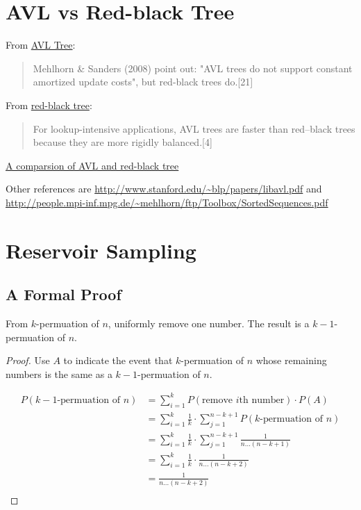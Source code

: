 \documentclass{book}
\begin{document}
\chapter{AVL vs Red-black Tree}

From \href{https://en.wikipedia.org/wiki/AVL_tree}{AVL Tree}:
\begin{quotation}
Mehlhorn \& Sanders (2008) point out: "AVL trees do not support constant amortized update costs", but red-black trees do.[21]
\end{quotation}


From \href{https://en.wikipedia.org/wiki/Red-black_tree}{red-black tree}:
\begin{quotation}
For lookup-intensive applications, AVL trees are faster than red–black trees because they are more rigidly balanced.[4]
\end{quotation}

\href{https://docs.google.com/presentation/d/1w_n0Ejpe7BGwJmASEXJIcOYWEc5O0Nycibc3IXQfH_c/edit#slide=id.g1221257ba_010}{A
comparsion of AVL and red-black tree}


Other references are \url{http://www.stanford.edu/~blp/papers/libavl.pdf} and
\url{http://people.mpi-inf.mpg.de/~mehlhorn/ftp/Toolbox/SortedSequences.pdf}

\chapter{Reservoir Sampling}
\section{A Formal Proof}
From $k$-permuation of $n$, uniformly remove one number. The result is a
$k-1$-permuation of $n$.

\begin{proof}
Use $A$ to indicate the event that $k$-permuation of $n$ whose remaining numbers is
the same as a $k-1$-permuation of $n$.

  \begin{align*}
    P(\text{$k-1$-permuation of $n$})
    &= \sum_{i=1}^{k}P(\text{remove $i$th number}) \cdot P(A) \\
    &= \sum_{i=1}^{k}\frac{1}{k} \cdot \sum_{j=1}^{n-k+1}P(\text{$k$-permuation
  of $n$}) \\
    &= \sum_{i=1}^{k}\frac{1}{k} \cdot \sum_{j=1}^{n-k+1}\frac{1}{n...(n-k+1)} \\
    &= \sum_{i=1}^{k}\frac{1}{k} \cdot \frac{1}{n...(n-k+2)} \\
    &= \frac{1}{n...(n-k+2)} \\
  \end{align*}
\end{proof}
\end{document}
